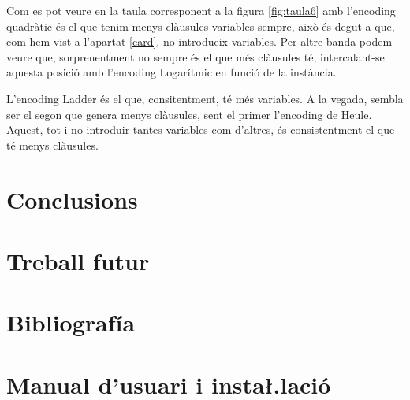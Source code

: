 \documentclass[11pt,a4paper,twoside]{report}
\begin{document}
  Com es pot veure en la taula corresponent a la figura \ref{fig:taula6} amb l'encoding quadràtic és el que tenim menys clàusules variables sempre, això és degut a que, com hem vist a l'apartat \ref{card}, no introdueix variables. 
  Per altre banda podem veure que, sorprenentment no sempre és el que més clàusules té, intercalant-se aquesta posició amb l'encoding Logarítmic en funció de la instància. 

  L'encoding Ladder és el que, consitentment, té més variables. 
  A la vegada, sembla ser el segon que genera menys clàusules, sent el primer l'encoding de Heule. Aquest, tot i no introduir tantes variables com d'altres, és consistentment el que té menys clàusules.




  \chapter{Conclusions}
  \chapter{Treball futur}

  \nocite{*}
  \chapter{Bibliografía}
  \printbibliography[heading=none]
  \chapter{Manual d'usuari i insta\l.lació}
  
  
  
\end{document}
